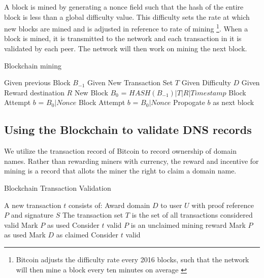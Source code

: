 \documentclass[11pt]{IEEEtran} %
\begin{document}
A block is mined by generating a nonce field such that the hash of the entire block is less than a global difficulty value. This difficulty sets the rate at which new blocks are mined and is adjusted in reference to rate of mining \footnote{Bitcoin adjusts the difficulty rate every 2016 blocks, such that the network will then mine a block every ten minutes on average \cite{bitdiff}}.  When a block is mined, it is transmitted to the network and each transaction in it is validated by each peer. The network will then work on mining the next block.

\begin{algorithm}
\caption{Blockchain mining}
\label{alg:mining}
\begin{algorithmic}[1]  %
\STATE Given previous Block $B_{-1}$
\STATE Given New Transaction Set $T$
\STATE Given Difficulty $D$
\STATE Given Reward destination $R$
\STATE New Block $B_0$ = $HASH(B_{-1})|T|R|Timestamp$
\STATE Block Attempt $b$ = $B_0|Nonce$
	\STATE Block Attempt $b$ = $B_0|Nonce$
\ENDWHILE
\STATE Propogate $b$ as next block
\end{algorithmic}
\end{algorithm}


\subsection{Using the Blockchain to validate DNS records}
We utilize the transaction record of Bitcoin to record ownership of domain names. Rather than rewarding miners with currency,  the reward and incentive for mining is a record that allots the miner the right to claim a domain name.  


\begin{algorithm}
\caption{Blockchain Transaction Validation}
\label{alg:validation}
\begin{algorithmic}[1]  %
\STATE A new transaction $t$ consists of: Award domain $D$ to user $U$ with proof reference $P$ and signature $S$
\STATE The transaction set $T$ is the set of all transactions considered valid
    		\STATE Mark $P$ as used
            \STATE Consider $t$ valid
        \ELSE
            	\STATE $P$ is an unclaimed mining reward
                	\STATE Mark $P$ as used
                    \STATE Mark $D$ as claimed
                    \STATE Consider $t$ valid
                \ENDIF
			\ENDIF
         \ENDIF
    \ENDIF
\ENDIF
\end{algorithmic}
\end{algorithm}
\end{document}
